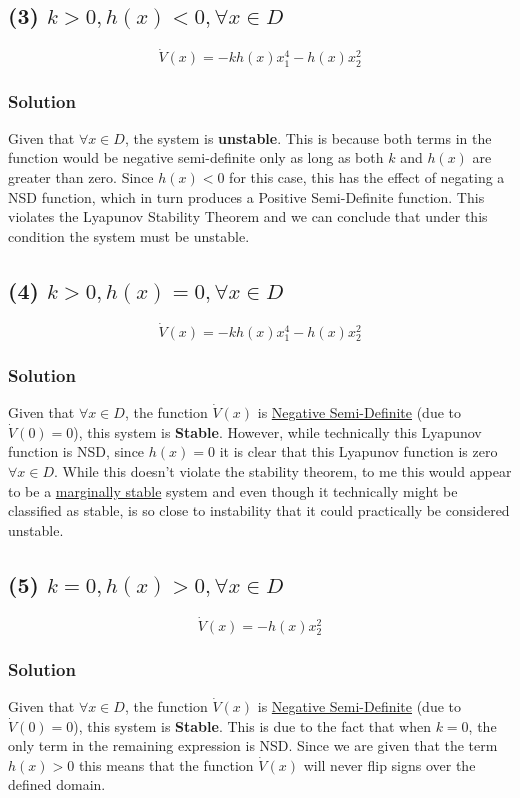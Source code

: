 \subsection*{(3) $k>0, h(x)<0, \forall x \in D$}


$$
\dot{V}(x) = -kh(x)x_1^4 - h(x)x_2^2
$$



\subsubsection*{Solution} Given that $\forall x \in D$, the system is \textbf{unstable}. This is because both terms in the function would be negative semi-definite only as long as both $k$ and $h(x)$ are greater than zero. Since $h(x)<0$ for this case, this has the effect of negating a NSD function, which in turn produces a Positive Semi-Definite function. This violates the Lyapunov Stability Theorem and we can conclude that under this condition the system must be unstable.


\subsection*{(4) $k>0, h(x)=0, \forall x \in D$}

$$
\dot{V}(x) = -kh(x)x_1^4 - h(x)x_2^2
$$

\subsubsection*{Solution} Given that $\forall x \in D$, the function $\dot{V}(x)$ is \underline{Negative Semi-Definite} (due to $\dot{V}(0)=0$), this system is \textbf{Stable}. However, while technically this Lyapunov function is NSD, since $h(x)=0$ it is clear that this Lyapunov function is zero $\forall x \in D$. While this doesn't violate the stability theorem, to me this would appear to be a \underline{marginally stable} system and even though it technically might be classified as stable, is so close to instability that it could practically be considered unstable.


\subsection*{(5) $k=0, h(x)>0, \forall x \in D$}

$$
\dot{V}(x) = - h(x)x_2^2
$$

\subsubsection*{Solution} Given that $\forall x \in D$, the function $\dot{V}(x)$ is \underline{Negative Semi-Definite} (due to $\dot{V}(0)=0$), this system is \textbf{Stable}. This is due to the fact that when $k=0$, the only term in the remaining expression is NSD. Since we are given that the term $h(x)>0$ this means that the function $\dot{V}(x)$ will never flip signs over the defined domain.


